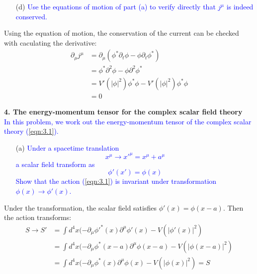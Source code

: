 \documentclass[11pt, a4paper]{article}
\begin{document}
\begin{enumerate}
    \item [(d)] \textcolor{blue}{
    Use the equations of motion of part (a) to verify directly that $j^\mu$ is indeed conserved.
    }
\end{enumerate}
Using the equation of motion, the conservation of the current can be checked with caculating the derivative:
\begin{align}
    \partial_\mu j^\mu & = \partial_\mu  (\phi^* \partial_t \phi - \phi \partial_t \phi^*) \\
    & = \phi^* \partial^2\phi - \phi \partial^2 \phi^* \\
    & = V'(|\phi|^2)\phi^*\phi -  V'(|\phi|^2)\phi^*\phi \\
    & = 0
\end{align}

\newpage

\textbf{4. The energy-momentum tensor for the complex scalar field theory}\\
\textcolor{blue}{
In this problem, we work out the energy-momentum tensor of the complex scalar theory (\ref{eqn:3.1}).
}
\begin{enumerate}
    \item [(a)] \textcolor{blue}{
    Under a spacetime translation
    \begin{equation}\label{eqn:4.1}
        x^\mu \to x'^\mu = x^\mu + a^\mu
    \end{equation}
    a scalar field transform as
    \begin{equation}\label{eqn:4.2}
        \phi'(x') = \phi(x)
    \end{equation}
    Show that the action (\ref{eqn:3.1}) is invariant under transformation $\phi(x) \to \phi'(x)$.
    }
\end{enumerate}
Under the transformation, the scalar field satisfies $\phi'(x) = \phi(x-a)$.
Then the action transforms:
\begin{align}
    S \to S' & = \int d^4 x (-\partial_\mu \phi'^*(x) \partial^\mu \phi'(x) - V(|\phi'(x)|^2) \\
    & = \int d^4x  (-\partial_\mu \phi^*(x-a) \partial^\mu \phi(x-a) - V(|\phi(x-a)|^2) \\
    & = \int d^4x  (-\partial_\mu \phi^*(x) \partial^\mu \phi(x) - V(|\phi(x)|^2) = S
\end{align}
\end{document}
